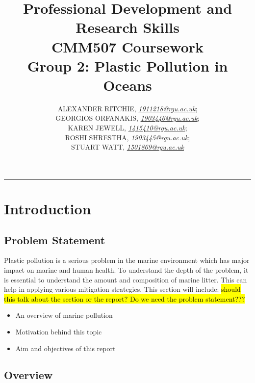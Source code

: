 \documentclass[10pt]{article}\usepackage[]{graphicx}\usepackage[]{color}
\begin{document}
\title{\LARGE Professional Development and Research Skills \\ CMM507 Coursework  \\ Group 2: Plastic Pollution in Oceans}

\author{ALEXANDER RITCHIE, \textit{\href{1911218@rgu.ac.uk}{1911218@rgu.ac.uk}};\\ GEORGIOS ORFANAKIS, \textit{\href{1903446@rgu.ac.uk}{1903446@rgu.ac.uk}};\\ KAREN JEWELL, \textit{\href{1415410@rgu.ac.uk}{1415410@rgu.ac.uk}};\\ ROSHI SHRESTHA, \textit{\href{1903445@rgu.ac.uk}{1903445@rgu.ac.uk}};\\ STUART WATT, \textit{\href{1501869@rgu.ac.uk}{1501869@rgu.ac.uk}}}

\maketitle
\noindent\rule{16cm}{0.4pt}


\section{Introduction}

\subsection{Problem Statement}\label{statement}

Plastic pollution is a serious problem in the marine environment which has major impact on marine and human health. To understand the depth of the problem, it is essential to understand the amount and composition of marine litter. This can help in applying various mitigation strategies. This section will include: \hl{should this talk about the section or the report? Do we need the problem statement???}
\begin{itemize}
\item An overview of marine pollution
\item Motivation behind this topic
\item Aim and objectives of this report
\end{itemize}


\subsection{Overview}\label{over}
\end{document}
